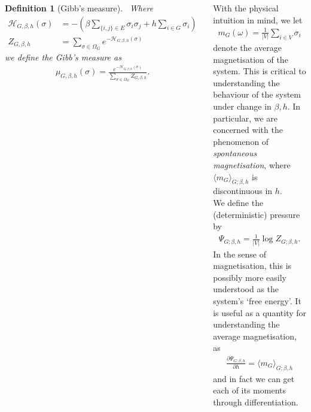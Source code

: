 \documentclass{tikzposter} %
\newtheorem{definition}{Definition}
\begin{document}
\begin{columns}
{    \begin{definition}[Gibb's measure]
      \ Where
      \begin{align*}
        \mathcal{H}_{G, \beta, h}(\sigma) &= -\left(\beta\sum_{\{i, j\} \in E} \sigma_i \sigma_j + h\sum_{i \in G} \sigma_i\right) \\
        Z_{G, \beta, h} &= \sum_{\sigma \in \Omega_G} e^{-\mathcal{H}_{G, \beta, h}(\sigma)}
      \end{align*}
      we define the Gibb's measure as
      \begin{align*}
      \mu_{G, \beta, h}(\sigma) = \frac{e^{-\mathcal{H}_{G, \beta, h}(\sigma)}}{\sum_{\sigma \in \Omega_G} Z_{G, \beta, h}}.
    \end{align*}
    \end{definition}
    \hphantom{}

    With the physical intuition in mind, we let
    \begin{align*}
      m_G(\omega) = \frac{1}{|V|} \sum_{i \in V} \sigma_i
    \end{align*}
    denote the average magnetisation of the system. This is critical to understanding the behaviour of the system under change in $\beta, h$. In particular, we are concerned with the phenomenon of \emph{spontaneous magnetisation}, where $\langle m_G \rangle_{G; \beta, h}$ is discontinuous in $h$. \\

    We define the (deterministic) pressure by
    \begin{align*}
      \Psi_{G; \beta, h} = \frac{1}{|V|} \log Z_{G; \beta, h}.
    \end{align*}
    In the sense of magnetisation, this is possibly more easily understood as the system's `free energy'. It is useful as a quantity for understanding the average magnetisation, as
    \begin{align*}
      \frac{\partial \Psi_{G; \beta, h}}{\partial h} = \langle m_G \rangle_{G; \beta, h}
    \end{align*}
    and in fact we can get each of its moments through differentiation. \\

}
\end{columns}
\end{document}
